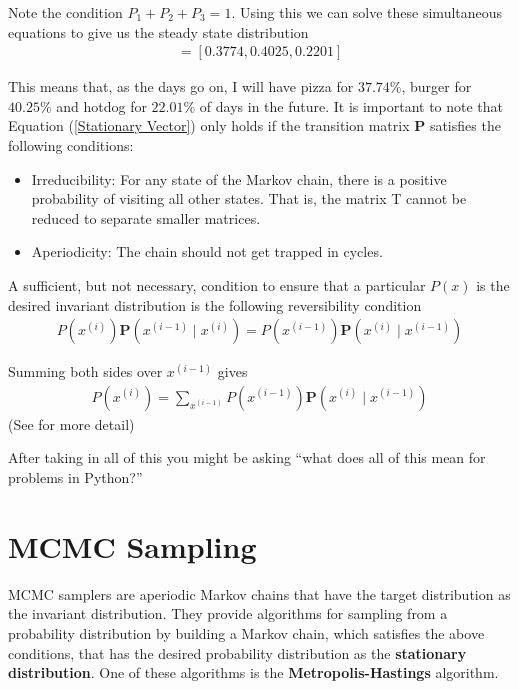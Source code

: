 \documentclass[12pt,twoside]{report}   %
\begin{document}
Note the condition $P_1 + P_2 + P_3 = 1$. Using this we can solve these simultaneous equations to give us the steady state distribution
\begin{align*}
[P_1,P_2,P_3] = [0.3774,0.4025,0.2201]
\end{align*}

This means that, as the days go on, I will have pizza for $37.74\%$, burger for $40.25\%$ and hotdog for $22.01\%$ of days in the future. It is important to note that Equation (\ref{Stationary Vector}) only holds if the transition matrix \textbf{P} satisfies the following conditions:
\begin{itemize}
\item Irreducibility: For any state of the Markov chain, there is a positive probability of visiting
all other states. That is, the matrix T cannot be reduced to separate smaller matrices.
\item Aperiodicity: The chain should not get trapped in cycles.
\end{itemize}

A sufficient, but not necessary, condition to ensure that a particular $P(x)$ is the desired
invariant distribution is the following reversibility condition
\begin{align}\label{reversibility}
P\left(x^{(i)}\right)\textbf{P}\left(x^{(i-1)}\mid x^{(i)}\right) = P\left(x^{(i-1)}\right)\textbf{P}\left(x^{(i)}\mid x^{(i-1)}\right)
\end{align}

Summing both sides over $x^{(i-1)}$ gives
\begin{align*}
P\left(x^{(i)}\right) = \sum_{x^{(i-1)}}P\left(x^{(i-1)}\right)\textbf{P}\left(x^{(i)}\mid x^{(i-1)}\right)
\end{align*}
(See \cite{3} for more detail)

After taking in all of this you might be asking ``what does all of this mean for problems in Python?''

\section{MCMC Sampling}\label{MCMC Sampling}

MCMC samplers are aperiodic Markov chains that have the target distribution as the invariant distribution. They provide algorithms for sampling from a probability distribution by building a Markov chain, which satisfies the above conditions, that has the desired probability distribution as the \textbf{stationary distribution}. One of these algorithms is the \textbf{Metropolis-Hastings} algorithm.
\pagebreak
\end{document}
